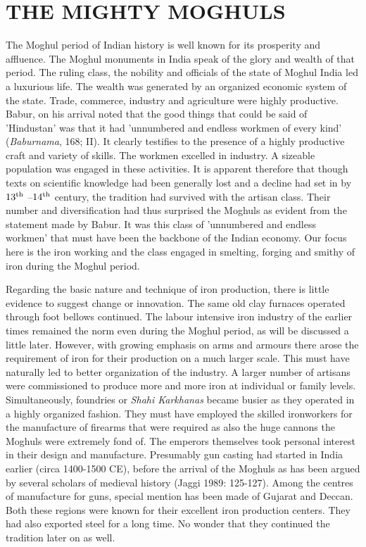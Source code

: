 \section*{THE MIGHTY MOGHULS}\label{section-2}

The Moghul period of Indian history is well known for its prosperity and affluence. The Moghul monuments in India speak of the glory and wealth of that period. The ruling class, the nobility and officials of the state of Moghul India led a luxurious life. The wealth was generated by an organized economic system of the state. Trade, commerce, industry and agriculture were highly productive. Babur, on his arrival noted that the good things that could be said of 'Hindustan' was that it had 'unnumbered and endless workmen of every kind' ({\it Baburnama}, 168; II). It clearly testifies to the presence of a highly productive craft and variety of skills. The workmen excelled in industry. A sizeable population was engaged in these activities. It is apparent therefore that though texts on scientific knowledge had been generally lost and a decline had set in by $13^{\rm th}$ –$14^{\rm th}$ century, the tradition had survived with the artisan class. Their number and diversification had thus surprised the Moghuls as evident from the statement made by Babur. It was this class of 'unnumbered and endless workmen' that must have been the backbone of the Indian economy. Our focus here is the iron working and the class engaged in smelting, forging and smithy of iron during the Moghul period.

Regarding the basic nature and technique of iron production, there is little evidence to suggest change or innovation. The same old clay furnaces operated through foot bellows continued. The labour intensive iron industry of the earlier times remained the norm even during the Moghul period, as will be discussed a little later. However, with growing emphasis on arms and armours there arose the requirement of iron for their production on a much larger scale. This must have naturally led to better organization of the industry. A larger number of artisans were commissioned to produce more and more iron at individual or family levels. Simultaneously, foundries or {\it Shahi Karkhanas} became busier as they operated in a highly organized fashion. They must have employed the skilled ironworkers for the manufacture of firearms that were required as also the huge cannons the Moghuls were extremely fond of. The emperors themselves took personal interest in their design and manufacture. Presumably gun casting had started in India earlier (circa 1400-1500 CE), before the arrival of the Moghuls as has been argued by several scholars of medieval history (Jaggi 1989: 125-127). Among the centres of manufacture for guns, special mention has been made of Gujarat and Deccan. Both these regions were known for their excellent iron production centers. They had also exported steel for a long time. No wonder that they continued the tradition later on as well.

